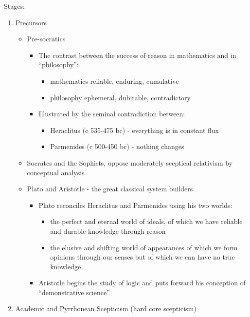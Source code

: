 \documentclass[14pt,titlepage]{extarticle}
\begin{document}
\nocite{sextusempiricus33}
\nocite{popkin03}

Stages:

\begin{enumerate}
\item Precursors
  \begin{itemize}
  \item Pre-socratics
    \begin{itemize}
    \item The contrast between the success of reason in mathematics and in ``philosophy'':
      \begin{itemize}
      \item mathematics reliable, enduring, cumulative
      \item philosophy ephemeral, dubitable, contradictory
      \end{itemize}
    \item Illustrated by the seminal contradiction between:
      \begin{itemize}
      \item Heraclitus (c 535-475 bc) - everything is in constant flux
      \item Parmenides (c 500-450 bc) - nothing changes
      \end{itemize}
    \end{itemize}

  \item Socrates and the Sophists, oppose moderately sceptical relativism by conceptual analysis
  \item Plato and Aristotle - the great classical system builders
    \begin{itemize}
    \item Plato reconciles Heraclitus and Parmenides using his two worlds:
      \begin{itemize}
      \item the perfect and eternal world of ideals, of which we have reliable and durable knowledge through reason
      \item the elusive and shifting world of appearances of which we form opinions through our senses but of which we can have no true knowledge
      \end{itemize}
    \item Aristotle begins the study of logic and puts forward his conception of ``demonstrative science''
    \end{itemize}
  \end{itemize}
\item Academic and Pyrrhonean Scepticism (hard core scepticism)


\end{enumerate}
\end{document}
